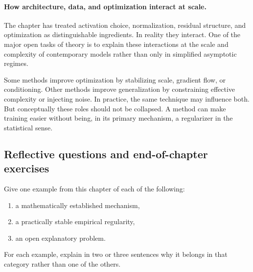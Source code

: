 \paragraph{How architecture, data, and optimization interact at scale.}
The chapter has treated activation choice, normalization, residual structure, and optimization as distinguishable ingredients.
In reality they interact.
One of the major open tasks of theory is to explain these interactions at the scale and complexity of contemporary models rather than only in simplified asymptotic regimes.

\begin{remark}
Some methods improve optimization by stabilizing scale, gradient flow, or conditioning.
Other methods improve generalization by constraining effective complexity or injecting noise.
In practice, the same technique may influence both.
But conceptually these roles should not be collapsed.
A method can make training easier without being, in its primary mechanism, a regularizer in the statistical sense.
\end{remark}



\subsection*{Reflective questions and end-of-chapter exercises}

\begin{exercise}
Give one example from this chapter of each of the following:
\begin{enumerate}
    \item a mathematically established mechanism,
    \item a practically stable empirical regularity,
    \item an open explanatory problem.
\end{enumerate}
For each example, explain in two or three sentences why it belongs in that category rather than one of the others.
\end{exercise}

